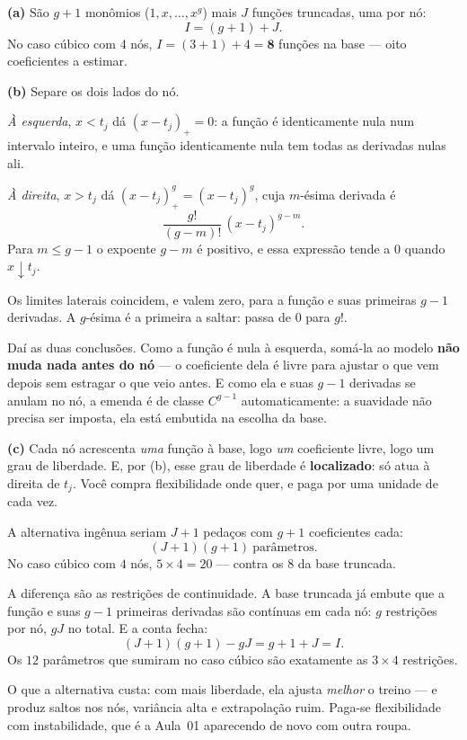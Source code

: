 \begin{solucao}
\textbf{(a)} São $g+1$ monômios ($1,x,\dots,x^g$) mais $J$ funções truncadas, uma
por nó:
\[
  I = (g+1) + J .
\]
No caso cúbico com $4$ nós, $I=(3+1)+4=\mathbf{8}$ funções na base --- oito
coeficientes a estimar.

\smallskip
\textbf{(b)} Separe os dois lados do nó.

\emph{À esquerda}, $x<t_j$ dá $(x-t_j)_+=0$: a função é identicamente nula num
intervalo inteiro, e uma função identicamente nula tem todas as derivadas nulas
ali.

\emph{À direita}, $x>t_j$ dá $(x-t_j)_+^g=(x-t_j)^g$, cuja $m$-ésima derivada é
\[
  \frac{g!}{(g-m)!}\,(x-t_j)^{g-m}.
\]
Para $m\le g-1$ o expoente $g-m$ é positivo, e essa expressão tende a $0$ quando
$x\downarrow t_j$.

Os limites laterais coincidem, e valem zero, para a função e suas primeiras $g-1$
derivadas. A $g$-ésima é a primeira a saltar: passa de $0$ para $g!$.

Daí as duas conclusões. Como a função é nula à esquerda, somá-la ao modelo
\textbf{não muda nada antes do nó} --- o coeficiente dela é livre para ajustar o
que vem depois sem estragar o que veio antes. E como ela e suas $g-1$ derivadas se
anulam no nó, a emenda é de classe $C^{g-1}$ automaticamente: a suavidade não
precisa ser imposta, ela está embutida na escolha da base.

\smallskip
\textbf{(c)} Cada nó acrescenta \emph{uma} função à base, logo \emph{um}
coeficiente livre, logo um grau de liberdade. E, por (b), esse grau de liberdade é
\textbf{localizado}: só atua à direita de $t_j$. Você compra flexibilidade onde
quer, e paga por uma unidade de cada vez.

A alternativa ingênua seriam $J+1$ pedaços com $g+1$ coeficientes cada:
\[
  (J+1)(g+1)\ \text{parâmetros.}
\]
No caso cúbico com $4$ nós, $5\times 4=20$ --- contra os $8$ da base truncada.

A diferença são as restrições de continuidade. A base truncada já embute que a
função e suas $g-1$ primeiras derivadas são contínuas em cada nó: $g$ restrições
por nó, $gJ$ no total. E a conta fecha:
\[
  (J+1)(g+1)-gJ = g+1+J = I .
\]
Os $12$ parâmetros que sumiram no caso cúbico são exatamente as $3\times 4$
restrições.

O que a alternativa custa: com mais liberdade, ela ajusta \emph{melhor} o treino
--- e produz saltos nos nós, variância alta e extrapolação ruim. Paga-se
flexibilidade com instabilidade, que é a Aula~01 aparecendo de novo com outra
roupa.


\end{solucao}
